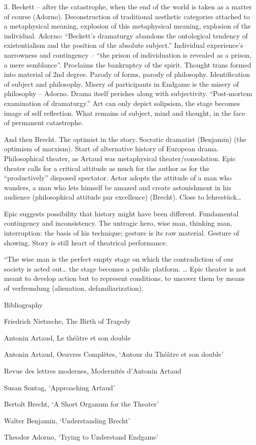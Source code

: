 \documentclass[oneside]{memoir}
\begin{document}
3. Beckett -- after the catastrophe, when the end of the world is taken
as a matter of course (Adorno). Deconstruction of traditional aesthetic
categories attached to a metaphysical meaning, explosion of this
metaphysical meaning, explosion of the individual. Adorno: ``Beckett's
dramaturgy abandons the ontological tendency of existentialism and the
position of the absolute subject.'' Individual experience's narrowness
and contingency -- ``the prison of individuation is revealed as a
prison, a mere semblance''. Proclaims the bankruptcy of the spirit.
Thought trans formed into material of 2nd degree. Parody of forms,
parody of philosophy. Identification of subject and philosophy. Misery
of participants in Endgame is the misery of philosophy -- Adorno. Drama
itself perishes along with subjectivity. ``Post-mortem examination of
dramaturgy.'' Art can only depict solipsism, the stage becomes image of
self reflection. What remains of subject, mind and thought, in the face
of permanent catastrophe.

And then Brecht. The optimist in the story. Socratic dramatist
(Benjamin) (the optimism of marxism). Start of alternative history of
European drama. Philosophical theater, as Artaud was metaphysical
theater/consolation. Epic theater calls for a critical attitude as much
for the author as for the ``productively'' disposed spectator. Actor
adopts the attitude of a man who wanders, a man who lets himself be
amazed and create astonishment in his audience (philosophical attitude
par excellence) (Brecht). Close to lehrestück\ldots{}

Epic suggests possibility that history might have been different.
Fundamental contingency and inconsistency. The untragic hero, wise man,
thinking man, interruption: the basis of his technique; gesture is its
raw material. Gesture of showing. Story is still heart of theatrical
performance.

``The wise man is the perfect empty stage on which the contradiction of
our society is acted out\ldots{} the stage becomes a public platform.
\ldots{} Epic theater is not meant to develop action but to represent
conditions, to uncover them by means of verfremdung (alienation,
defamiliarization).

Bibliography

Friedrich Nietzsche, The Birth of Tragedy

Antonin Artaud, Le théâtre et son double

Antonin Artaud, Oeuvres Complètes, `Autour du Théâtre et son double'

Revue des lettres modernes, Modernités d'Antonin Artaud

Susan Sontag, `Approaching Artaud'

Bertolt Brecht, `A Short Organum for the Theater'

Walter Benjamin, `Understanding Brecht'

Theodor Adorno, `Trying to Understand Endgame'

%
\end{document}
